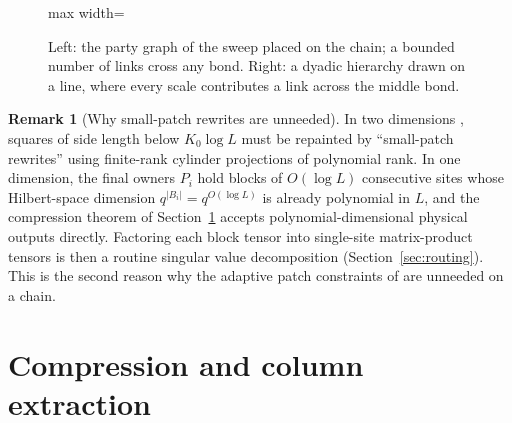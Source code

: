 \documentclass[aps,prx,reprint,superscriptaddress,floatfix,nofootinbib,longbibliography,amsmath,amssymb]{revtex4-2}
\newcommand{\abs}[1]{\lvert #1\rvert}
\theoremstyle{plain}
\theoremstyle{definition}
\newtheorem{remark}[theorem]{Remark}
\begin{document}
\begin{figure}[t]
\centering
\begin{adjustbox}{max width=\linewidth}

\end{adjustbox}
\caption{Left: the party graph of the sweep placed on the chain; a bounded number of links cross any bond. Right: a dyadic hierarchy drawn on a line, where every scale contributes a link across the middle bond.}\label{fig:party-graph}
\end{figure}

\begin{remark}[Why small-patch rewrites are unneeded]
In two dimensions \cite[Section~4]{PP}, squares of side length below $K_0\log L$
must be repainted by ``small-patch rewrites'' using finite-rank cylinder
projections of polynomial rank. In one dimension, the final owners $P_i$ hold
blocks of $O(\log L)$ consecutive sites whose Hilbert-space dimension
$q^{\abs{B_i}}=q^{O(\log L)}$ is already polynomial in $L$, and the compression
theorem of Section~\ref{sec:compression} accepts polynomial-dimensional physical
outputs directly. Factoring each block tensor into single-site matrix-product
tensors is then a routine singular value decomposition (Section~\ref{sec:routing}).
This is the second reason why the adaptive patch constraints of \cite{PP} are
unneeded on a chain.
\end{remark}

\section{Compression and column extraction}\label{sec:compression}
\end{document}
